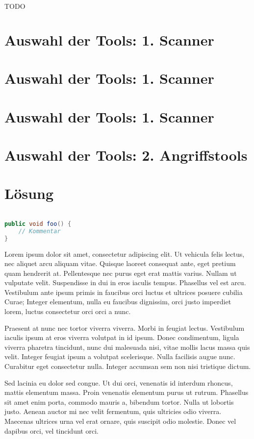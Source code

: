 \documentclass[12pt,oneside,a4paper,parskip]{scrbook}
\begin{document}
TODO







\chapter{Auswahl der Tools: 1. Scanner}
\chapter{Auswahl der Tools: 1. Scanner}
\chapter{Auswahl der Tools: 1. Scanner}
\chapter{Auswahl der Tools: 2. Angriffstools}

\chapter{Lösung}

\begin{lstlisting}[label=lst:java,
				   language=java,
				   firstnumber=1,
				   caption=Beispiel für einen Quelltext]

public void foo() {
	// Kommentar
}
\end{lstlisting}

Lorem ipsum dolor sit amet, consectetur adipiscing elit. Ut vehicula felis lectus, nec aliquet arcu aliquam vitae. Quisque laoreet consequat ante, eget pretium quam hendrerit at. Pellentesque nec purus eget erat mattis varius. Nullam ut vulputate velit. Suspendisse in dui in eros iaculis tempus. Phasellus vel est arcu. Vestibulum ante ipsum primis in faucibus orci luctus et ultrices posuere cubilia Curae; Integer elementum, nulla eu faucibus dignissim, orci justo imperdiet lorem, luctus consectetur orci orci a nunc.

Praesent at nunc nec tortor viverra viverra. Morbi in feugiat lectus. Vestibulum iaculis ipsum at eros viverra volutpat in id ipsum. Donec condimentum, ligula viverra pharetra tincidunt, nunc dui malesuada nisi, vitae mollis lacus massa quis velit. Integer feugiat ipsum a volutpat scelerisque. Nulla facilisis augue nunc. Curabitur eget consectetur nulla. Integer accumsan sem non nisi tristique dictum.

Sed lacinia eu dolor sed congue. Ut dui orci, venenatis id interdum rhoncus, mattis elementum massa. Proin venenatis elementum purus ut rutrum. Phasellus sit amet enim porta, commodo mauris a, bibendum tortor. Nulla ut lobortis justo. Aenean auctor mi nec velit fermentum, quis ultricies odio viverra. Maecenas ultrices urna vel erat ornare, quis suscipit odio molestie. Donec vel dapibus orci, vel tincidunt orci.
\end{document}
